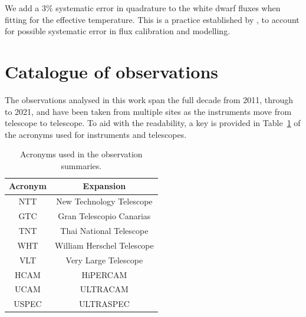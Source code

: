 We add a 3\% systematic error in quadrature to the white dwarf fluxes when fitting for the effective temperature. This is a practice established by \citet{McAllister2019}, to account for possible systematic error in flux calibration and modelling.

\newpage
\section{Catalogue of observations}

The observations analysed in this work span the full decade from 2011, through to 2021, and have been taken from multiple sites as the instruments move from telescope to telescope. To aid with the readability, a key is provided in Table~\ref{tab:observation acronyms} of the acronyms used for instruments and telescopes.

\begin{table}
    \centering
    \begin{tabular}{c|c}
        Acronym & Expansion \\
        \hline
        NTT & New Technology Telescope \\
        GTC & Gran Telescopio Canarias \\
        TNT & Thai National Telescope \\
        WHT & William Herschel Telescope \\
        VLT & Very Large Telescope \\
        HCAM & HiPERCAM \\
        UCAM & ULTRACAM \\
        USPEC & ULTRASPEC \\
    \end{tabular}
    \caption{Acronyms used in the observation summaries.}
    \label{tab:observation acronyms}
\end{table}
